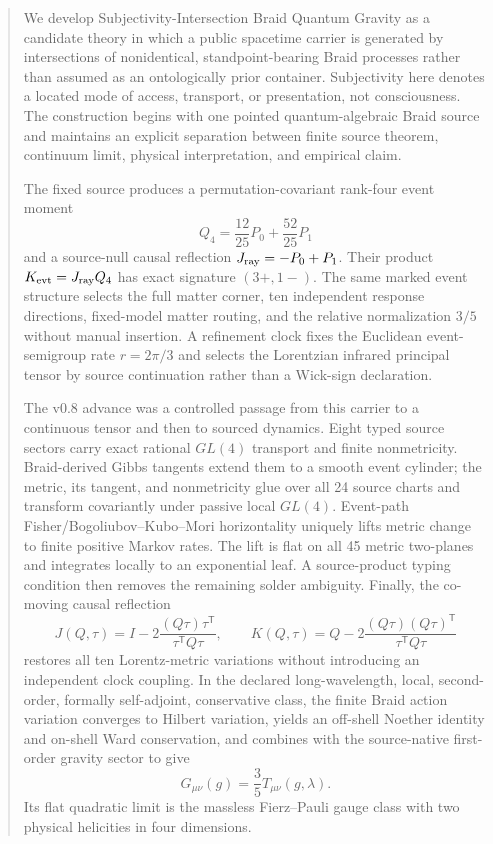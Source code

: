 \documentclass[11pt]{article}
\theoremstyle{definition}
\theoremstyle{remark}
\begin{document}
\begin{abstract}
We develop Subjectivity-Intersection Braid Quantum Gravity as a candidate theory in which a public spacetime carrier is generated by intersections of nonidentical, standpoint-bearing Braid processes rather than assumed as an ontologically prior container. Subjectivity here denotes a located mode of access, transport, or presentation, not consciousness. The construction begins with one pointed quantum-algebraic Braid source and maintains an explicit separation between finite source theorem, continuum limit, physical interpretation, and empirical claim.

The fixed source produces a permutation-covariant rank-four event moment
\[
Q_4=\frac{12}{25}P_0+\frac{52}{25}P_1
\]
and a source-null causal reflection $J_{\rm ray}=-P_0+P_1$. Their product $K_{\rm evt}=J_{\rm ray}Q_4$ has exact signature $(3+,1-)$. The same marked event structure selects the full matter corner, ten independent response directions, fixed-model matter routing, and the relative normalization $3/5$ without manual insertion. A refinement clock fixes the Euclidean event-semigroup rate $r=2\pi/3$ and selects the Lorentzian infrared principal tensor by source continuation rather than a Wick-sign declaration.

The v0.8 advance was a controlled passage from this carrier to a continuous tensor and then to sourced dynamics. Eight typed source sectors carry exact rational $GL(4)$ transport and finite nonmetricity. Braid-derived Gibbs tangents extend them to a smooth event cylinder; the metric, its tangent, and nonmetricity glue over all 24 source charts and transform covariantly under passive local $GL(4)$. Event-path Fisher/Bogoliubov--Kubo--Mori horizontality uniquely lifts metric change to finite positive Markov rates. The lift is flat on all 45 metric two-planes and integrates locally to an exponential leaf. A source-product typing condition then removes the remaining solder ambiguity. Finally, the co-moving causal reflection
\[
J(Q,\tau)=I-2\frac{(Q\tau)\tau^{\mathsf T}}{\tau^{\mathsf T}Q\tau},\qquad
K(Q,\tau)=Q-2\frac{(Q\tau)(Q\tau)^{\mathsf T}}{\tau^{\mathsf T}Q\tau}
\]
restores all ten Lorentz-metric variations without introducing an independent clock coupling. In the declared long-wavelength, local, second-order, formally self-adjoint, conservative class, the finite Braid action variation converges to Hilbert variation, yields an off-shell Noether identity and on-shell Ward conservation, and combines with the source-native first-order gravity sector to give
\[
G_{\mu\nu}(g)=\frac35T_{\mu\nu}(g,\lambda).
\]
Its flat quadratic limit is the massless Fierz--Pauli gauge class with two physical helicities in four dimensions.


\end{abstract}
\end{document}
